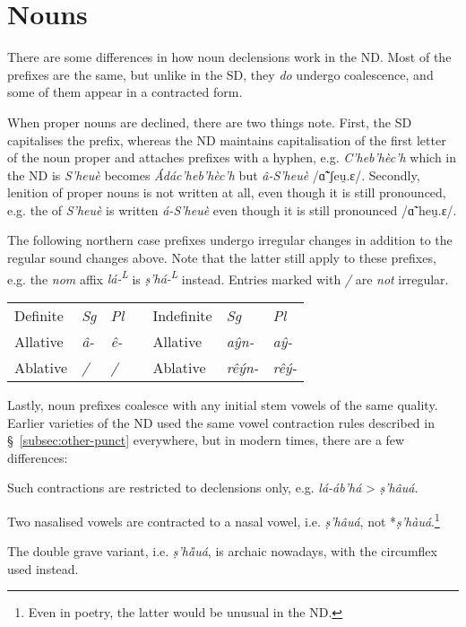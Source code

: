 \documentclass[a4paper, 12pt, twoside, openright, final]{book}
\let \nf \normalfont
\def \L {\textsuperscript{L}}
\let \w \textit
\begin{document}
\section{Nouns}
There are some differences in how noun declensions work in the ND. Most of the prefixes are the same, but unlike in the SD,
they \textit{do} undergo coalescence, and some of them appear in a contracted form.

When proper nouns are declined, there are two things note. First, the SD capitalises the prefix, whereas the ND maintains capitalisation
of the first letter of the noun proper and attaches prefixes with a hyphen, e.g. \w{C’heb’hèc’h} which in the ND is \w{S’heuè}
becomes   \w{Ádác’heb’hèc’h} but  \w{â-S’heuè} /ɑ̃̃ˈʃeu̯.ɛ/. Secondly, lenition of proper nouns is not
written at all, even though it is still pronounced, e.g. the  of \w{S’heuè} is written \w{á-S’heuè} even though it is
still pronounced /ɑ̃ˈheu̯.ɛ/.

The following northern case prefixes undergo irregular changes in addition to the regular sound changes above. Note that the
latter still apply to these prefixes, e.g. the \w{nom} affix \w{lá-\L} is \w{ṣ’há-\L} instead. Entries marked with \textit{/}
are \textit{not} irregular.
\noindent\begin{longtable}{l|>{\it}l|>{\it}lll|>{\it}l|>{\it}l}
Definite    &\nf Sg&\nf Pl && Indefinite       &\nf Sg&\nf Pl\\\cline{1-3}\cline{5-7}
Allative         & â-            & ê-       && Allative  & aŷn-       & aŷ-  \\
Ablative         & /             & /        && Ablative  & rêýn-      & rêý-  \\
\end{longtable}

\noindent
Lastly, noun prefixes coalesce with any initial stem vowels of the same quality. Earlier varieties of the ND used the
same vowel contraction rules described in §~\ref{subsec:other-punct} everywhere, but in modern times, there are a few
differences:
\begin{items}
    \item Such contractions are restricted to declensions only, e.g.  \w{lá-áb’há} >  \w{ṣ’hâuá}.
    \item Two nasalised vowels are contracted to a nasal vowel, i.e. \w{ṣ’hâuá}, not *\w{ṣ’hàuá}.\footnote{Even in
        poetry, the latter would be unusual in the ND.}
    \item The double grave variant, i.e. \w{ṣ’hȁuá}, is archaic nowadays, with the circumflex used instead.
\end{items}
\end{document}
